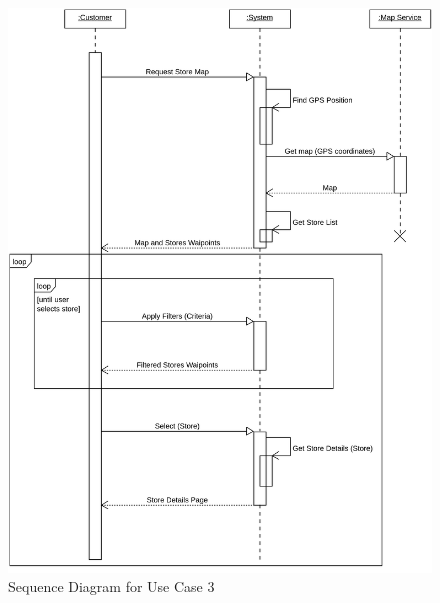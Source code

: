 \begin{figure}[H]
    \includegraphics[width=\textwidth]{Images/UML_Seq_Diag_3.png}
    \caption{\label{fig:Use_Case_Diag}Sequence Diagram for Use Case 3}
\end{figure}

